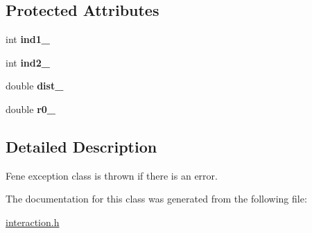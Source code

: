 \subsection*{Protected Attributes}
\begin{DoxyCompactItemize}
\item 
\hypertarget{classFeneException_aa1f88371f02cca1c4fc16e8e3300b1ba}{int {\bfseries ind1\-\_\-}}\label{classFeneException_aa1f88371f02cca1c4fc16e8e3300b1ba}

\item 
\hypertarget{classFeneException_a723fb7fca56d3c0427a484e7a25180ef}{int {\bfseries ind2\-\_\-}}\label{classFeneException_a723fb7fca56d3c0427a484e7a25180ef}

\item 
\hypertarget{classFeneException_a4a3752aa9e4bd86e8244cb95c76ba713}{double {\bfseries dist\-\_\-}}\label{classFeneException_a4a3752aa9e4bd86e8244cb95c76ba713}

\item 
\hypertarget{classFeneException_adb4d7db732aa4a784fa2c4ec0c68744d}{double {\bfseries r0\-\_\-}}\label{classFeneException_adb4d7db732aa4a784fa2c4ec0c68744d}

\end{DoxyCompactItemize}


\subsection{Detailed Description}
Fene exception class is thrown if there is an error. 

The documentation for this class was generated from the following file\-:\begin{DoxyCompactItemize}
\item 
\hyperlink{interaction_8h}{interaction.\-h}\end{DoxyCompactItemize}
